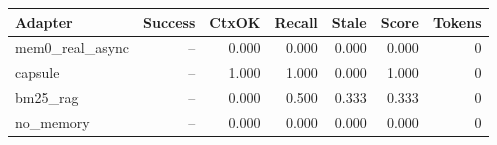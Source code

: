 \begin{tabular}{lrrrrrr}
\hline
Adapter & Success & CtxOK & Recall & Stale & Score & Tokens \\
\hline
mem0\_real\_async & -- & 0.000 & 0.000 & 0.000 & 0.000 & 0 \\
capsule & -- & 1.000 & 1.000 & 0.000 & 1.000 & 0 \\
bm25\_rag & -- & 0.000 & 0.500 & 0.333 & 0.333 & 0 \\
no\_memory & -- & 0.000 & 0.000 & 0.000 & 0.000 & 0 \\
\hline
\end{tabular}
